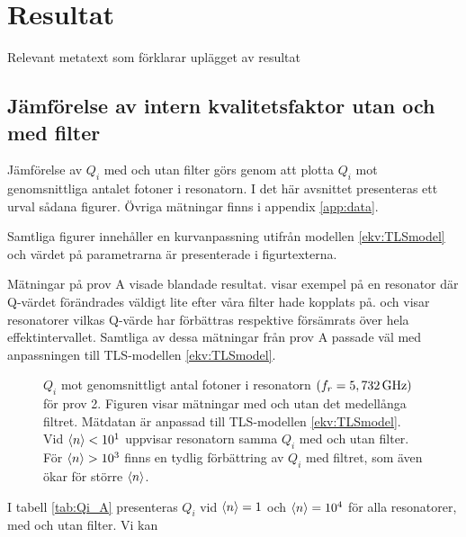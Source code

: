 \documentclass[main.tex]{subfiles}
\begin{document}
\chapter{Resultat}
\label{sec:results}
Relevant metatext som förklarar uplägget av resultat

\section{Jämförelse av intern kvalitetsfaktor utan och med filter}
Jämförelse av $Q_i$ med och utan filter görs genom att plotta $Q_i$ mot genomsnittliga antalet fotoner i resonatorn. I det här avsnittet presenteras ett urval sådana figurer. Övriga mätningar finns i appendix \ref{app:data}.

Samtliga figurer innehåller en kurvanpassning utifrån modellen \ref{ekv:TLSmodel} och värdet på parametrarna är presenterade i figurtexterna.

Mätningar på prov A visade blandade resultat.  visar exempel på en resonator där Q-värdet förändrades väldigt lite efter våra filter hade kopplats på.  och  visar resonatorer vilkas Q-värde har förbättras respektive försämrats över hela effektintervallet. Samtliga av dessa mätningar från prov A passade väl med anpassningen till TLS-modellen \ref{ekv:TLSmodel}.


\begin{figure}[H]
  \centering
  \setlength{}
  \setlength\figureheight{12em}
  
  \caption{$Q_i$ mot genomsnittligt antal fotoner i resonatorn $(f_r=\unit[5,732]{GHz})$ för prov 2. Figuren visar mätningar med och utan det medellånga filtret. Mätdatan är anpassad till TLS-modellen \eqref{ekv:TLSmodel}. Vid $\expval{n}<10^1$ uppvisar resonatorn samma $Q_i$ med och utan filter. För $\expval{n}>10^3$ finns en tydlig förbättring av $Q_i$ med filtret, som även ökar för större $\expval{n}$.}
  \label{fig:Qi_n}
\end{figure}

I tabell \ref{tab:Qi_A} presenteras $Q_i$ vid $\expval{n}=1$ och $\expval{n}=10^4$ för alla resonatorer, med och utan filter. Vi kan
\end{document}
